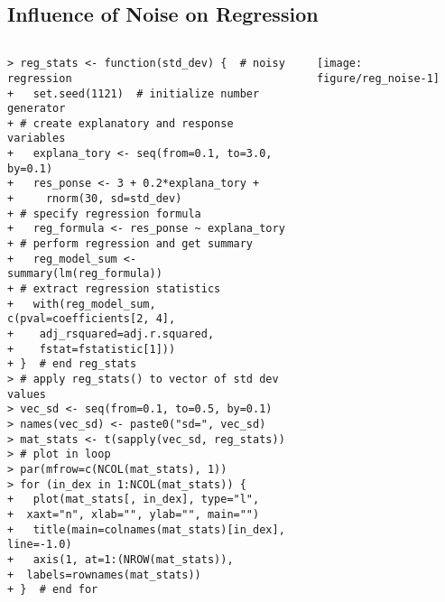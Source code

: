 \documentclass[10pt]{beamer}\usepackage[]{graphicx}\usepackage[]{color}
\makeatletter
\newenvironment{kframe}{%
 \def\at@end@of@kframe{}%
 \ifinner\ifhmode%
  \def\at@end@of@kframe{\end{minipage}}%
  \begin{minipage}{\columnwidth}%
 \fi\fi%
 \def\FrameCommand##1{\hskip\@totalleftmargin \hskip-\fboxsep
 \colorbox{shadecolor}{##1}\hskip-\fboxsep
     \hskip-\linewidth \hskip-\@totalleftmargin \hskip\columnwidth}%
 \MakeFramed {\advance\hsize-\width
   \@totalleftmargin\z@ \linewidth\hsize
   \@setminipage}}%
 {\par\unskip\endMakeFramed%
 \at@end@of@kframe}
\newenvironment{knitrout}{}{} %
\makeatother
\begin{document}
\subsection{Influence of Noise on Regression}
\begin{frame}[fragile,t]{\subsecname}
\vspace{-1em}
\begin{block}{}
  \begin{columns}[T]
    \vspace{-2em}
\begin{knitrout}\scriptsize
{}\color{fgcolor}\begin{kframe}
\begin{verbatim}
> reg_stats <- function(std_dev) {  # noisy regression
+   set.seed(1121)  # initialize number generator
+ # create explanatory and response variables
+   explana_tory <- seq(from=0.1, to=3.0, by=0.1)
+   res_ponse <- 3 + 0.2*explana_tory +
+     rnorm(30, sd=std_dev)
+ # specify regression formula
+   reg_formula <- res_ponse ~ explana_tory
+ # perform regression and get summary
+   reg_model_sum <- summary(lm(reg_formula))
+ # extract regression statistics
+   with(reg_model_sum, c(pval=coefficients[2, 4],
+    adj_rsquared=adj.r.squared,
+    fstat=fstatistic[1]))
+ }  # end reg_stats
> # apply reg_stats() to vector of std dev values
> vec_sd <- seq(from=0.1, to=0.5, by=0.1)
> names(vec_sd) <- paste0("sd=", vec_sd)
> mat_stats <- t(sapply(vec_sd, reg_stats))
> # plot in loop
> par(mfrow=c(NCOL(mat_stats), 1))
> for (in_dex in 1:NCOL(mat_stats)) {
+   plot(mat_stats[, in_dex], type="l",
+  xaxt="n", xlab="", ylab="", main="")
+   title(main=colnames(mat_stats)[in_dex], line=-1.0)
+   axis(1, at=1:(NROW(mat_stats)),
+  labels=rownames(mat_stats))
+ }  # end for
\end{verbatim}
\end{kframe}
\end{knitrout}
      \vspace{-1em}
      \texttt{[image: figure/reg\_noise-1]}
  \end{columns}
\end{block}

\end{frame}


\end{document}
